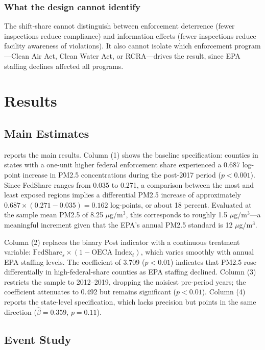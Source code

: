 \documentclass[12pt]{article}
\begin{document}
\subsubsection*{What the design cannot identify} The shift-share cannot distinguish between enforcement deterrence (fewer inspections reduce compliance) and information effects (fewer inspections reduce facility awareness of violations). It also cannot isolate which enforcement program---Clean Air Act, Clean Water Act, or RCRA---drives the result, since EPA staffing declines affected all programs.

\section{Results}\label{sec:results}

\subsection{Main Estimates}

 reports the main results. Column (1) shows the baseline specification: counties in states with a one-unit higher federal enforcement share experienced a 0.687 log-point increase in PM2.5 concentrations during the post-2017 period ($p < 0.001$). Since FedShare ranges from 0.035 to 0.271, a comparison between the most and least exposed regions implies a differential PM2.5 increase of approximately $0.687 \times (0.271 - 0.035) = 0.162$ log-points, or about 18 percent. Evaluated at the sample mean PM2.5 of 8.25 $\mu$g/m$^3$, this corresponds to roughly 1.5 $\mu$g/m$^3$---a meaningful increment given that the EPA's annual PM2.5 standard is 12 $\mu$g/m$^3$.

Column (2) replaces the binary Post indicator with a continuous treatment variable: $\text{FedShare}_s \times (1 - \text{OECA Index}_t)$, which varies smoothly with annual EPA staffing levels. The coefficient of 3.709 ($p < 0.01$) indicates that PM2.5 rose differentially in high-federal-share counties as EPA staffing declined. Column (3) restricts the sample to 2012--2019, dropping the noisiest pre-period years; the coefficient attenuates to 0.492 but remains significant ($p < 0.01$). Column (4) reports the state-level specification, which lacks precision but points in the same direction ($\hat{\beta} = 0.359$, $p = 0.11$).



\subsection{Event Study}
\end{document}
